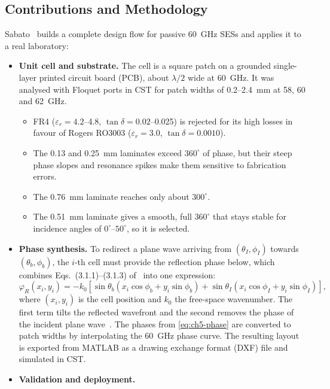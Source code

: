 \subsection{Contributions and Methodology}
Sabato~\cite{Sabato2025} builds a complete design flow for passive 60~GHz SESs and applies it to a real laboratory:
\begin{itemize}
    \item \textbf{Unit cell and substrate.} The cell is a square patch on a grounded single-layer printed circuit board (PCB), about $\lambda/2$ wide at 60~GHz. It was analysed with Floquet ports in CST for patch widths of 0.2--2.4~mm at 58, 60 and 62~GHz.
    \begin{itemize}
        \item FR4 ($\varepsilon_r = 4.2$--4.8, $\tan\delta = 0.02$--0.025) is rejected for its high losses in favour of Rogers RO3003 ($\varepsilon_r = 3.0$, $\tan\delta = 0.0010$).
        \item The 0.13 and 0.25~mm laminates exceed $360^\circ$ of phase, but their steep phase slopes and resonance spikes make them sensitive to fabrication errors.
        \item The 0.76~mm laminate reaches only about $300^\circ$.
        \item The 0.51~mm laminate gives a smooth, full $360^\circ$ that stays stable for incidence angles of $0^\circ$--$50^\circ$, so it is selected.
    \end{itemize}
    \item \textbf{Phase synthesis.} To redirect a plane wave arriving from $(\theta_I, \phi_I)$ towards $(\theta_b, \phi_b)$, the $i$-th cell must provide the reflection phase below, which combines Eqs.~(3.1.1)--(3.1.3) of~\cite{Sabato2025} into one expression:
    \begin{equation}\label{eq:ch5-phase}
    \varphi_R(x_i,y_i) = -k_0\left[\sin\theta_b\left(x_i\cos\phi_b + y_i\sin\phi_b\right) + \sin\theta_I\left(x_i\cos\phi_I + y_i\sin\phi_I\right)\right],
    \end{equation}
    where $(x_i, y_i)$ is the cell position and $k_0$ the free-space wavenumber. The first term tilts the reflected wavefront and the second removes the phase of the incident plane wave~\cite{Sabato2025}. The phases from \eqref{eq:ch5-phase} are converted to patch widths by interpolating the 60~GHz phase curve. The resulting layout is exported from MATLAB as a drawing exchange format (DXF) file and simulated in CST.
    \item \textbf{Validation and deployment.}

\end{itemize}
